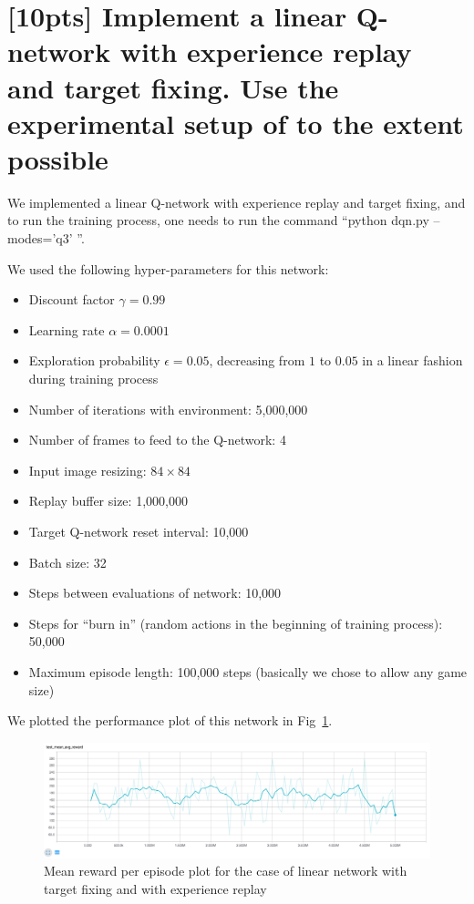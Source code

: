 \documentclass{article}
\begin{document}
\section{[10pts] Implement a linear Q-network with experience replay and target fixing. Use the experimental setup of \cite{mnih2013playing,mnih2015human} to the extent possible}

We implemented a linear Q-network with experience replay and target fixing, and to run the training process, one needs to run the command ``python dqn.py --modes='q3' ''.

We used the following hyper-parameters for this network:
\begin{itemize}
  \item Discount factor $\gamma=0.99$
  \item Learning rate $\alpha=0.0001$
  \item Exploration probability $\epsilon=0.05$, decreasing from $1$ to $0.05$ in a linear fashion during training process
  \item Number of iterations with environment: 5,000,000
  \item Number of frames to feed to the Q-network: 4
  \item Input image resizing: $84\times84$
  \item Replay buffer size: 1,000,000
  \item Target Q-network reset interval: 10,000
  \item Batch size: 32
  \item Steps between evaluations of network: 10,000
  \item Steps for ``burn in'' (random actions in the beginning of training process): 50,000
  \item Maximum episode length: 100,000 steps (basically we chose to allow any game size)
\end{itemize}

We plotted the performance plot of this network in Fig~\ref{fig:r_q3}.


\begin{figure}[h] 
  \centering
  \includegraphics[width=1.0\textwidth]{images/r_q3}
  \caption{Mean reward per episode plot for the case of linear network with target fixing and with experience replay}
  \label{fig:r_q3}
\end{figure}
\end{document}
